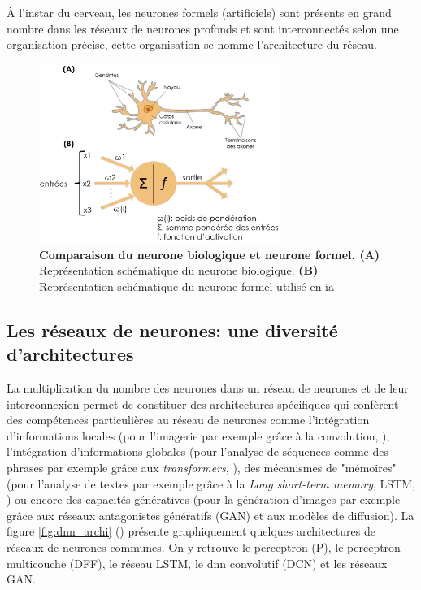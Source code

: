 À l'instar du cerveau, les neurones formels (artificiels) sont présents en grand nombre dans les réseaux de neurones profonds et sont interconnectés selon une organisation précise, cette organisation se nomme l'architecture du réseau.
\begin{figure}[!ht]
 \centering
 \includegraphics[width=0.7\textwidth]{figures/neuronne.png}
 \caption[Comparaison du neurone biologique et du neurone formel]{\textbf{Comparaison du neurone biologique et neurone formel. (A) }Représentation schématique du neurone biologique. \textbf{(B)} Représentation schématique du neurone formel utilisé en \gls{ia}}
 \label{fig:neurons}
\end{figure}
\subsection{Les réseaux de neurones: une diversité d'architectures}
La multiplication du nombre des neurones dans un réseau de neurones et de leur interconnexion permet de constituer des architectures spécifiques qui confèrent des compétences particulières au réseau de neurones comme l'intégration d'informations locales (pour l'imagerie par exemple grâce à la convolution, \cite{fukushima_neocognitron_1980}), l'intégration d'informations globales (pour l'analyse de séquences comme des phrases par exemple grâce aux \textit{transformers}, \cite{vaswani_attention_2017}), des mécanismes de "mémoires" (pour l'analyse de textes par exemple grâce à la \textit{Long short-term memory}, LSTM, \cite{hochreiter_long_1997}) ou encore des capacités génératives (pour la génération d'images par exemple grâce aux réseaux antagonistes génératifs (GAN) et aux modèles de diffusion). La figure \ref{fig:dnn_archi} (\cite{leijnen_neural_2016}) présente graphiquement quelques architectures de réseaux de neurones communes. On y retrouve le perceptron (P), le perceptron multicouche (DFF), le réseau LSTM, le \gls{dnn} convolutif (DCN) et les réseaux GAN.


